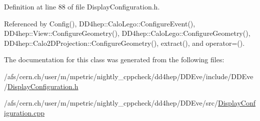 Definition at line 88 of file DisplayConfiguration.h.

Referenced by Config(), DD4hep::CaloLego::ConfigureEvent(), DD4hep::View::ConfigureGeometry(), DD4hep::CaloLego::ConfigureGeometry(), DD4hep::Calo2DProjection::ConfigureGeometry(), extract(), and operator=().

The documentation for this class was generated from the following files:\begin{DoxyCompactItemize}
\item 
/afs/cern.ch/user/m/mpetric/nightly\_\-cppcheck/dd4hep/DDEve/include/DDEve/\hyperlink{_display_configuration_8h}{DisplayConfiguration.h}\item 
/afs/cern.ch/user/m/mpetric/nightly\_\-cppcheck/dd4hep/DDEve/src/\hyperlink{_display_configuration_8cpp}{DisplayConfiguration.cpp}\end{DoxyCompactItemize}

